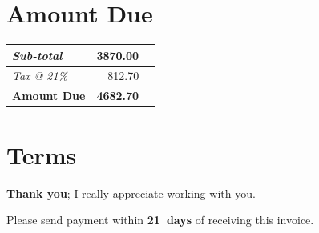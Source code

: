 \documentclass[a4paper,table]{article}
\begin{document}
\section*{Amount Due}
\label{sec:orgheadline2}

\hfill\colorbox{prlp-gray96}{\begin{minipage}{7.5cm}
\begin{center}
\begin{tabu}{Xrl}
\emph{Sub-total} & 3870.00 & \texteuro{}\\
\hline
\emph{Tax @ 21\%} & 812.70 & \texteuro{}\\
\hline
\textbf{Amount Due} & \textbf{\large{4682.70}} & \textbf{\texteuro{}}\\
\end{tabu}
\end{center}

\end{minipage}}

\section*{Terms}
\label{sec:orgheadline3}

\textbf{Thank you}; I really appreciate working with you.

Please send payment within \textbf{21~days} of receiving this invoice.

\vfill
\end{document}

